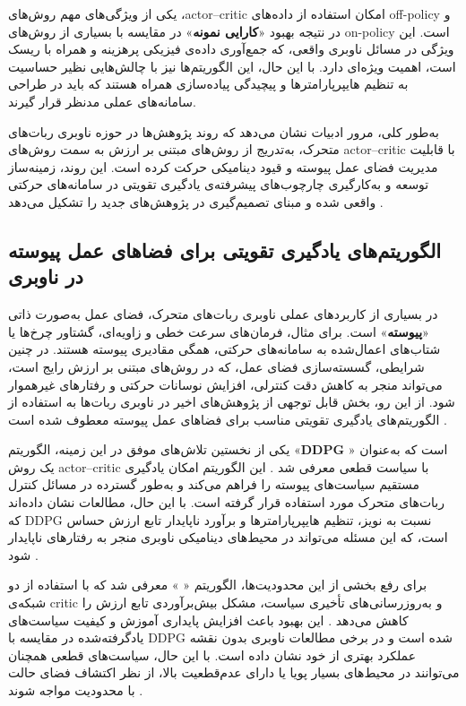 \begin{itemize}
یکی از ویژگی‌های مهم روش‌های ،actor--critic امکان استفاده از داده‌های off-policy و در نتیجه بهبود «\textbf{کارایی نمونه}» در مقایسه با بسیاری از روش‌های on-policy است. این ویژگی در مسائل ناوبری واقعی، که جمع‌آوری داده‌ی فیزیکی پرهزینه و همراه با ریسک است، اهمیت ویژه‌ای دارد. با این حال، این الگوریتم‌ها نیز با چالش‌هایی نظیر حساسیت به تنظیم هایپرپارامترها و پیچیدگی پیاده‌سازی همراه هستند که باید در طراحی سامانه‌های عملی مدنظر قرار گیرند.
\end{itemize}
به‌طور کلی، مرور ادبیات نشان می‌دهد که روند پژوهش‌ها در حوزه ناوبری ربات‌های متحرک، به‌تدریج از روش‌های مبتنی بر ارزش به سمت روش‌های actor--critic با قابلیت مدیریت فضای عمل پیوسته و قیود دینامیکی حرکت کرده است. این روند، زمینه‌ساز توسعه و به‌کارگیری چارچوب‌های پیشرفته‌ی یادگیری تقویتی در سامانه‌های حرکتی واقعی شده و مبنای تصمیم‌گیری در پژوهش‌های جدید را تشکیل می‌دهد%
\cite{Alsolami2025AutonomousNavigationSurvey}.
\subsection{الگوریتم‌های یادگیری تقویتی برای فضاهای عمل پیوسته در ناوبری}

در بسیاری از کاربردهای عملی ناوبری ربات‌های متحرک، فضای عمل به‌صورت ذاتی «\textbf{پیوسته}»%
%
	است. برای مثال، فرمان‌های سرعت خطی و زاویه‌ای، گشتاور چرخ‌ها یا شتاب‌های اعمال‌شده به سامانه‌های حرکتی، همگی مقادیری پیوسته هستند. در چنین شرایطی، گسسته‌سازی فضای عمل، که در روش‌های مبتنی بر ارزش رایج است، می‌تواند منجر به کاهش دقت کنترلی، افزایش نوسانات حرکتی و رفتارهای غیرهموار شود. از این رو، بخش قابل توجهی از پژوهش‌های اخیر در ناوبری ربات‌ها به استفاده از الگوریتم‌های یادگیری تقویتی مناسب برای فضاهای عمل پیوسته معطوف شده است%
\cite{Kober2013RLRobotics,Alsolami2025AutonomousNavigationSurvey}.

یکی از نخستین تلاش‌های موفق در این زمینه، الگوریتم «\textbf{DDPG}%
» است که به‌عنوان یک روش actor--critic با سیاست قطعی معرفی شد%
\cite{Lillicrap2016}. %
 این الگوریتم امکان یادگیری مستقیم سیاست‌های پیوسته را فراهم می‌کند و به‌طور گسترده در مسائل کنترل ربات‌های متحرک مورد استفاده قرار گرفته است. با این حال، مطالعات نشان داده‌اند که DDPG نسبت به نویز، تنظیم هایپرپارامترها و برآورد ناپایدار تابع ارزش حساس است، که این مسئله می‌تواند در محیط‌های دینامیکی ناوبری منجر به رفتارهای ناپایدار شود%
\cite{Kober2013RLRobotics}.

برای رفع بخشی از این محدودیت‌ها، الگوریتم «\textbf{}%
» معرفی شد که با استفاده از دو شبکه‌ی critic و به‌روزرسانی‌های تأخیری سیاست، مشکل بیش‌برآوردی تابع ارزش را کاهش می‌دهد%
\cite{FujimotoTD3}. %
 این بهبود باعث افزایش پایداری آموزش و کیفیت سیاست‌های یادگرفته‌شده در مقایسه با DDPG شده است و در برخی مطالعات ناوبری بدون نقشه عملکرد بهتری از خود نشان داده است. با این حال، سیاست‌های قطعی  همچنان می‌توانند در محیط‌های بسیار پویا یا دارای عدم‌قطعیت بالا، از نظر اکتشاف فضای حالت با محدودیت مواجه شوند%
\cite{Nasti2025MaplessTD3}.

